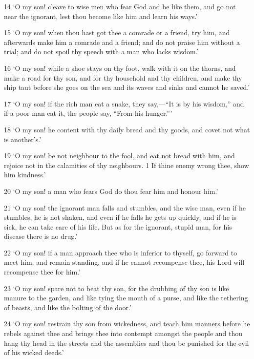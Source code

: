 \par 14 ‘O my son! cleave to wise men who fear God and be like them, and go not near the ignorant, lest thou become like him and learn his ways.’

\par 15 ‘O my son! when thou hast got thee a comrade or a friend, try him, and afterwards make him a comrade and a friend; and do not praise him without a trial; and do not spoil thy speech with a man who lacks wisdom.’

\par 16 ‘O my son! while a shoe stays on thy foot, walk with it on the thorns, and make a road for thy son, and for thy household and thy children, and make thy ship taut before she goes on the sea and its waves and sinks and cannot he saved.’

\par 17 ‘O my son! if the rich man eat a snake, they say,—“It is by his wisdom,” and if a poor man eat it, the people say, “From his hunger.”’

\par 18 ‘O my son! he content with thy daily bread and thy goods, and covet not what is another's.’

\par 19 ‘O my son! be not neighbour to the fool, and eat not bread with him, and rejoice not in the calamities of thy neighbours. 1 If thine enemy wrong thee, show him kindness.’

\par 20 ‘O my son! a man who fears God do thou fear him and honour him.’

\par 21 ‘O my son! the ignorant man falls and stumbles, and the wise man, even if he stumbles, he is not shaken, and even if he falls he gets up quickly, and if he is sick, he can take care of his life. But as for the ignorant, stupid man, for his disease there is no drug.’

\par 22 ‘O my son! if a man approach thee who is inferior to thyself, go forward to meet him, and remain standing, and if he cannot recompense thee, his Lord will recompense thee for him.’

\par 23 ‘O my son! spare not to beat thy son, for the drubbing of thy son is like manure to the garden, and like tying the mouth of a purse, and like the tethering of beasts, and like the bolting of the door.’

\par 24 ‘O my son! restrain thy son from wickedness, and teach him manners before he rebels against thee and brings thee into contempt amongst the people and thou hang thy head in the streets and the assemblies and thou be punished for the evil of his wicked deeds.’

